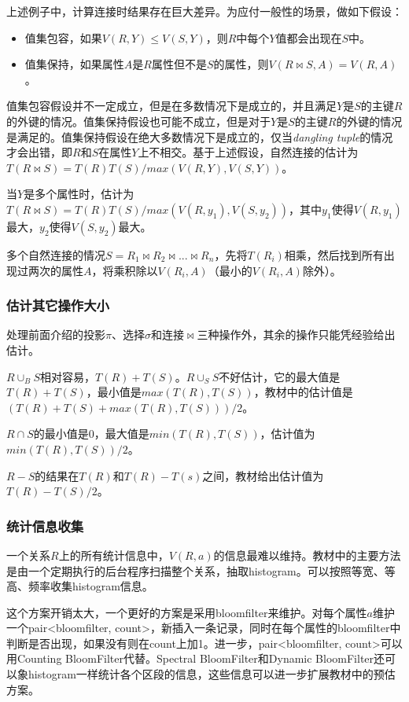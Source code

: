 上述例子中，计算连接时结果存在巨大差异。为应付一般性的场景，做如下假设：
\begin{itemize}
    \item 值集包容，如果$V(R,Y) \le V(S,Y)$，则$R$中每个$Y$值都会出现在$S$中。
    \item 值集保持，如果属性$A$是$R$属性但不是$S$的属性，则$V(R\bowtie S,A)=V(R,A)$。
\end{itemize}
值集包容假设并不一定成立，但是在多数情况下是成立的，并且满足$Y$是$S$的主键$R$的外键的情况。值集保持假设也可能不成立，但是对于$Y$是$S$的主键$R$的外键的情况是满足的。值集保持假设在绝大多数情况下是成立的，仅当\emph{dangling tuple}的情况才会出错，即$R$和$S$在属性$Y$上不相交。基于上述假设，自然连接的估计为$T(R\bowtie S)=T(R)T(S)/max(V(R,Y),V(S,Y))$。

当$Y$是多个属性时，估计为$T(R\bowtie S)=T(R)T(S)/max(V(R,y_1),V(S,y_2))$，其中$y_1$使得$V(R,y_1)$最大，$y_2$使得$V(S,y_2)$最大。

多个自然连接的情况$S=R_1 \bowtie R_2 \bowtie ... \bowtie R_n$，先将$T(R_i)$相乘，然后找到所有出现过两次的属性$A$，将乘积除以$V(R_i,A)$（最小的$V(R_i,A)$除外）。

\subsubsection*{估计其它操作大小}

处理前面介绍的投影$\pi$、选择$\sigma$和连接$\bowtie$三种操作外，其余的操作只能凭经验给出估计。

$R \cup_B S$相对容易，$T(R)+T(S)$。$R \cup_S S$不好估计，它的最大值是$T(R)+T(S)$，最小值是$max(T(R),T(S))$，教材中的估计值是$(T(R)+T(S)+max(T(R),T(S)))/2$。

$R \cap S$的最小值是0，最大值是$min(T(R),T(S))$，估计值为$min(T(R),T(S))/2$。

$R-S$的结果在$T(R)$和$T(R)-T(s)$之间，教材给出估计值为$T(R)-T(S)/2$。

\subsubsection*{统计信息收集}

一个关系$R$上的所有统计信息中，$V(R,a)$的信息最难以维持。教材中的主要方法是由一个定期执行的后台程序扫描整个关系，抽取histogram。可以按照等宽、等高、频率收集histogram信息。

这个方案开销太大，一个更好的方案是采用bloomfilter来维护。对每个属性$a$维护一个pair<bloomfilter, count>，新插入一条记录，同时在每个属性的bloomfilter中判断是否出现，如果没有则在count上加1。进一步，pair<bloomfilter, count>可以用Counting BloomFilter代替。Spectral BloomFilter和Dynamic BloomFilter还可以象histogram一样统计各个区段的信息，这些信息可以进一步扩展教材中的预估方案。

